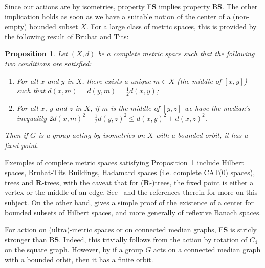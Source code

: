 \documentclass[a4paper]{article}
\newcommand{\PH}[1]{\todo[color={blue!33},size=small]{#1}}
\newtheorem{prop}[lem]{Proposition}
\theoremstyle{definition}
\newcommand*{\field}[1]{\mathbf{#1}}
\newcommand*{\R}{\field{R}}
\newcommand*{\BS}{B$\mathbf{S}$}
\begin{document}
Since our actions are by isometries, property F$\mathbf S$ implies property \BS. The other implication holds as soon as we have a suitable notion of the center of a (non-empty) bounded subset $X$.
For a large class of metric spaces, this is provided by the following result of Bruhat and Tits:
%
%
\begin{prop}\label{Proposition:Mediane}
Let $(X,d)$ be a complete metric space such that the following two conditions are satisfied:
\begin{enumerate}
\item For all $x$ and $y$ in $X$, there exists a unique $m\in X$ (the middle of $[x,y]$) such that $d(x,m)=d(y,m)=\frac12d(x,y)$;
\item For all $x$, $y$ and $z$ in $X$, if $m$ is the middle of $[y,z]$ we have the median's inequality  $2d(x,m)^2+\frac12d(y,z)^2\leq d(x,y)^2+d(x,z)^2$.
\end{enumerate}
Then if $G$ is a group acting by isometries on $X$ with a bounded orbit, it has a fixed point.
\end{prop}
%
%
Exemples of complete metric spaces satisfying Proposition~\ref{Proposition:Mediane} include Hilbert spaces, Bruhat-Tits Buildings, Hadamard spaces (i.e. complete CAT(0) spaces), trees and $\R$-trees, with the caveat that for ($\R$-)trees, the fixed point is either a vertex or the middle of an edge.
See~\cite[Chapter 3.b]{MR1023471} and the references therein for more on this subject.
On the other hand, \cite[Lemma 2.2.7]{Bekka2008} gives a simple proof of the existence of a center for bounded subsets of Hilbert spaces, and more generally of reflexive Banach spaces.

For action on (ultra)-metric spaces or on connected median graphs, F$\mathbf S$ is stricly stronger than \BS. Indeed, this trivially follows from the action by rotation of $C_4$ on the square graph.
However,  by \cite{MR1663779, Cornulier2013} if a group $G$ acts on a connected median graph with a bounded orbit, then it has a finite orbit.\\[3ex]
\end{document}
